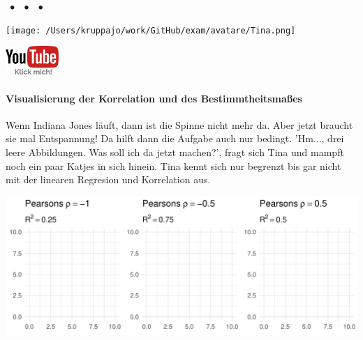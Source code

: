 \documentclass[a4paper, 9pt]{scrartcl}\usepackage[]{graphicx}\usepackage[]{xcolor}
\makeatletter
\def\maxwidth{ %
  \ifdim\Gin@nat@width>\linewidth
    \linewidth
  \else
    \Gin@nat@width
  \fi
}
\makeatother
\begin{document}
 
\ifcollection
\begin{flushright}
\tiny\vspace{-3Ex}
\textbf{\examinhaltstart}
\exammodulestat $\;\bullet$
\exammodulestatbbv $\;\bullet$
\exammodulestatversuch $\;\bullet$
\exammodulebiostat
\vspace{-4Ex}
\end{flushright}
\begin{minipage}[t]{0.5\textwidth}
\texttt{[image: /Users/kruppajo/work/GitHub/exam/avatare/Tina.png]}
\end{minipage}
\begin{minipage}[t]{0.5\textwidth}
\hfill
\href{https://youtu.be/g7imB3A5_zw}{\includegraphics[width = 2cm]{img/youtube}}
\end{minipage}
\vspace{-3ex}
\fi



\ifcollection
\paragraph{Visualisierung der Korrelation und des Bestimmtheitsmaßes}
\fi

Wenn Indiana Jones läuft, dann ist die Spinne nicht mehr da. Aber jetzt braucht sie mal Entspannung! Da hilft dann die Aufgabe auch nur bedingt. 'Hm..., drei leere Abbildungen. Was soll ich da jetzt machen?', fragt sich Tina und mampft noch ein paar Katjes in sich hinein. Tina kennt sich nur begrenzt bis gar nicht mit der linearen Regresion und Korrelation aus.
\vspace{2Ex}



{\centering \includegraphics[width=\maxwidth]{img/correlation-01-1} 

}
\end{document}
